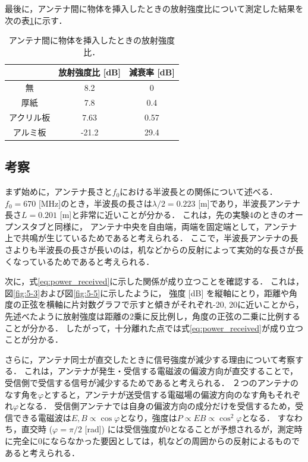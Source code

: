 \documentclass[uplatex,dvipdfmx,a4j,12pt]{jsarticle}
\begin{document}
最後に，アンテナ間に物体を挿入したときの放射強度比について測定した結果を次の表\ref{table:5-2}に示す．

\begin{table}[H]
    \centering
    \caption{アンテナ間に物体を挿入したときの放射強度比．}
    \label{table:5-2}
    \begin{tabular}{ccc}
        \hline
        & 放射強度比 [dB] & 減衰率 [dB]\\
        \hline
        \hline
        無 & 8.2 & 0 \\
        厚紙 & 7.8 & 0.4\\
        アクリル板 & 7.63 & 0.57\\
        アルミ板 & -21.2 & 29.4\\
        \hline
    \end{tabular}
\end{table}


\subsection{考察}
まず始めに，アンテナ長さと$f_0$における半波長との関係について述べる．
$f_0 = 670$ [MHz]のとき，半波長の長さは$\lambda / 2 = 0.223$ [m]であり，半波長アンテナ長さ$L = 0.201$ [m]と非常に近いことが分かる．
これは，先の実験4のときのオープンスタブと同様に，
アンテナ中央を自由端，両端を固定端として，アンテナ上で共鳴が生じているためであると考えられる．
ここで，半波長アンテナの長さよりも半波長の長さが長いのは，机などからの反射によって実効的な長さが長くなっているためであると考えられる．

次に，式\eqref{eq:power_received}に示した関係が成り立つことを確認する．
これは，図\ref{fig:5-3}および図\ref{fig:5-5}に示したように，
強度 [dB] を縦軸にとり，距離や角度の正弦を横軸に片対数グラフで示すと傾きがそれぞれ-20, 20に近いことから，
先述べたように放射強度は距離の2乗に反比例し，角度の正弦の二乗に比例することが分かる．
したがって，十分離れた点では式\eqref{eq:power_received}が成り立つことが分かる．

さらに，アンテナ同士が直交したときに信号強度が減少する理由について考察する．
これは，アンテナが発生・受信する電磁波の偏波方向が直交することで，受信側で受信する信号が減少するためであると考えられる．
２つのアンテナのなす角を$\varphi$とすると，アンテナが送受信する電磁場の偏波方向のなす角もそれぞれ$\varphi$となる．
受信側アンテナでは自身の偏波方向の成分だけを受信するため，受信できる電磁波は$E, B \propto \cos \varphi$となり，強度は$P \propto E B \propto \cos^2 \varphi$となる．
すなわち，直交時 ($\varphi = \pi/2$ [rad]) には受信強度が0となることが予想されるが，測定時に完全に0にならなかった要因としては，机などの周囲からの反射によるものであると考えられる．
\end{document}
